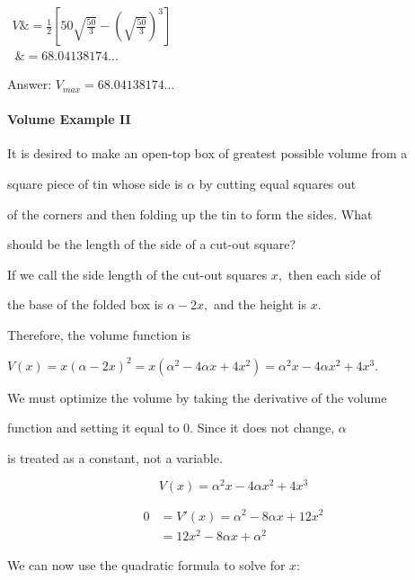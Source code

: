 $\begin{aligned}

 V \&=\frac{1}{2}\left[50\sqrt{\frac{50}{3}}-\left(\sqrt{\frac{50}{3}}\right)^3\right] \\\ \&=68.04138174...

\end{aligned}$



Answer: $V_{max}=68.04138174...$



\paragraph{Volume Example II}



It is desired to make an open-top box of greatest possible volume from a

square piece of tin whose side is $\alpha$ by cutting equal squares out

of the corners and then folding up the tin to form the sides. What

should be the length of the side of a cut-out square?






If we call the side length of the cut-out squares $x,$ then each side of

the base of the folded box is $\alpha-2x,$ and the height is $x.$

Therefore, the volume function is

$V(x)=x(\alpha-2x)^2=x(\alpha^2-4\alpha x+4x^2)=\alpha^2x-4\alpha x^2+4x^3.$

We must optimize the volume by taking the derivative of the volume

function and setting it equal to 0. Since it does not change, $\alpha$

is treated as a constant, not a variable.



$$V(x)=\alpha^2x-4\alpha x^2+4x^3$$



\begin{align}
 0&=V'(x)=\alpha^2-8\alpha x+12x^2 \\\ &= 12x^{2}-8\alpha x+\alpha^{2}
\end{align}



We can now use the quadratic formula to solve for $x$:



